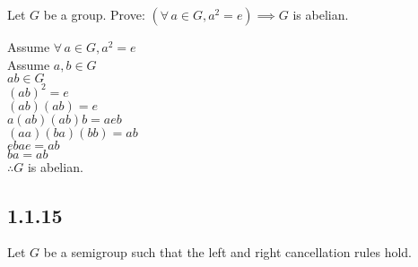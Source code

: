 \documentclass[letterpaper,12pt,fleqn]{article}
\begin{document}
Let $G$ be a group. Prove: $\left(\forall\,a\in G,a^2=e\right)\implies G$
is abelian.

Assume $\forall\,a\in G,a^2=e$ \\
Assume $a,b\in G$ \\
$ab\in G$ \\
$(ab)^2=e$ \\
$(ab)(ab)=e$ \\
$a(ab)(ab)b=aeb$ \\
$(aa)(ba)(bb)=ab$ \\
$ebae=ab$ \\
$ba=ab$ \\
$\therefore G$ is abelian.

\subsection*{1.1.15}

Let $G$ be a semigroup such that the left and right cancellation rules hold.
\end{document}
